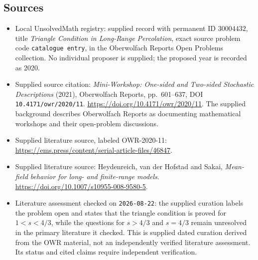 \documentclass[11pt]{article}
\begin{document}
\subsection{Sources}
\begin{itemize}
\item Local UnsolvedMath registry: supplied record with permanent ID \(30004432\), title \emph{Triangle Condition in Long-Range Percolation}, exact source problem code \texttt{catalogue entry}, in the Oberwolfach Reports Open Problems collection. No individual proposer is supplied; the proposed year is recorded as 2020.
\item Supplied source citation: \emph{Mini-Workshop: One-sided and Two-sided Stochastic Descriptions} (2021), Oberwolfach Reports, pp.\ 601--637, DOI \texttt{10.4171/owr/2020/11}. \url{https://doi.org/10.4171/owr/2020/11}. The supplied background describes Oberwolfach Reports as documenting mathematical workshops and their open-problem discussions.
\item Supplied literature source, labeled OWR-2020-11: \url{https://ems.press/content/serial-article-files/46847}.
\item Supplied literature source: Heydenreich, van der Hofstad and Sakai, \emph{Mean-field behavior for long- and finite-range models}. \url{https://doi.org/10.1007/s10955-008-9580-5}.
\item Literature assessment checked on \texttt{2026-08-22}: the supplied curation labels the problem open and states that the triangle condition is proved for \(1<s<4/3\), while the questions for \(s>4/3\) and \(s=4/3\) remain unresolved in the primary literature it checked. This is supplied dated curation derived from the OWR material, not an independently verified literature assessment. Its status and cited claims require independent verification.
\end{itemize}
\end{document}
